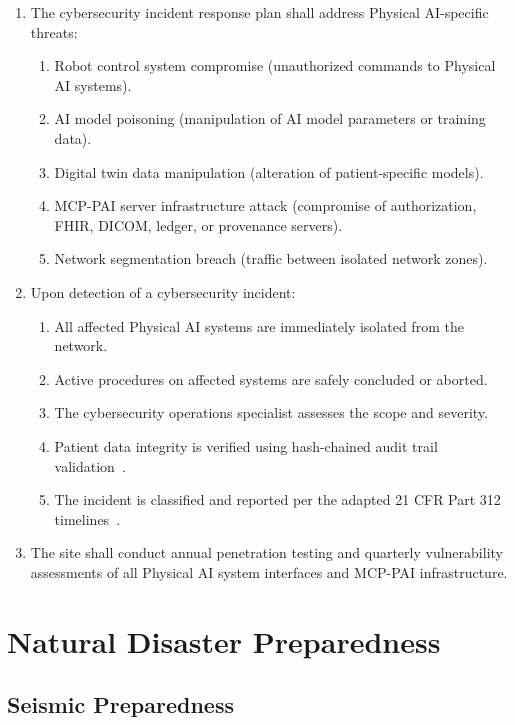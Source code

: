 \documentclass[11pt,letterpaper]{article}
\begin{document}
\begin{enumerate}[label=(\alph*)]
\item The cybersecurity incident response plan shall address Physical
  AI-specific threats:
  \begin{enumerate}[label=(\arabic*)]
  \item Robot control system compromise (unauthorized commands to Physical AI
    systems).
  \item AI model poisoning (manipulation of AI model parameters or training
    data).
  \item Digital twin data manipulation (alteration of patient-specific models).
  \item MCP-PAI server infrastructure attack (compromise of authorization,
    FHIR, DICOM, ledger, or provenance servers).
  \item Network segmentation breach (traffic between isolated network
    zones).
  \end{enumerate}

\item Upon detection of a cybersecurity incident:
  \begin{enumerate}[label=(\arabic*)]
  \item All affected Physical AI systems are immediately isolated from the
    network.
  \item Active procedures on affected systems are safely concluded or aborted.
  \item The cybersecurity operations specialist assesses the scope and
    severity.
  \item Patient data integrity is verified using hash-chained audit trail
    validation~\cite{iche6r3adapt}.
  \item The incident is classified and reported per the adapted 21 CFR
    Part 312 timelines~\cite{cfr312adapt}.
  \end{enumerate}

\item The site shall conduct annual penetration testing and quarterly
  vulnerability assessments of all Physical AI system interfaces and
  MCP-PAI infrastructure.
\end{enumerate}

\section{Natural Disaster Preparedness}

\subsection{Seismic Preparedness}
\end{document}
